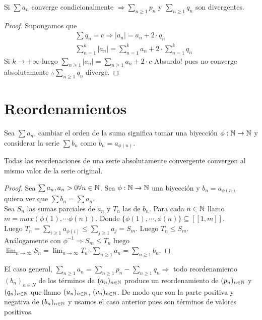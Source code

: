\begin{theorem}
  Si \(\sum a_n\) converge condicionalmente \(\Rightarrow \sum_{n \geq 1} p_n\) y \(\sum_{n \geq 1} q_n\) son divergentes.

  \begin{proof}
    Supongamos que \begin{align*}
      & \sum q_n = c \Rightarrow |a_n| = a_n + 2 \cdot q_n \\
      & \sum_{n = 1}^k |a_n| = \sum_{n = 1}^k a_n + 2 \cdot \sum_{n = 1}^k q_n
    \end{align*}
    Si \(k \to +\infty\) luego \(\sum_{n \geq 1} |a_n| = \sum_{n \geq 1} a_n + 2 \cdot c\) Absurdo! pues no converge absolutamente \(\therefore \sum_{n \geq 1} q_n\) diverge.
  \end{proof}
\end{theorem}

\section{Reordenamientos}

\begin{definition}
  Sea \(\sum a_n\), cambiar el orden de la suma significa tomar una biyección \(\phi: \mathbb{N} \to \mathbb{N}\) y considerar la serie \(\sum b_n\) como \(b_n = a_{\phi(n)}\).
\end{definition}

\begin{theorem}
  Todas las reordenaciones de una serie absolutamente convergente convergen al mismo valor de la serie original.
  \begin{proof}
    Sea \(\sum a_n, a_n > 0 \forall n \in \mathbb{N}\). Sea \(\phi: \mathbb{N} \to \mathbb{N}\) una biyección y \(b_n = a_{\phi(n)}\) quiero ver que \(\sum b_n = \sum a_n\). \\
    Sea \(S_n\) las sumas parciales de \(a_n\) y \(T_n\) las de \(b_n\). Para cada \(n \in \mathbb{N}\) llamo \(m = max(\phi(1), \cdots \phi(n))\). Donde \(\{ \phi(1), \cdots, \phi(n) \} \subseteq [[1, m]]\). \\
    Luego \(T_n = \sum_{i \geq 1} a_{\phi(i)} \leq \sum_{j \geq 1} a_j = S_m\). Luego \(T_n \leq S_m\). \\
    Análogamente con \(\phi^{-1} \Rightarrow S_m \leq T_n\) luego \(\lim_{n \to \infty} S_n = \lim_{n \to \infty} T_n \therefore \sum_{n \geq 1} a_n = \sum_{n \geq 1} b_n\).
  \end{proof}
\end{theorem}

El caso general, \(\sum_{n \geq 1} a_n = \sum_{n \geq 1} p_n - \sum_{n \geq 1} q_n \Rightarrow\) todo reordenamiento \((b_n)_{n \in N}\) de los términos de \((a_n)_{n \in \mathbb{N}}\) produce un reordenamiento de \((p_n)_{n \in \mathbb{N}}\) y \((q_n)_{n \in \mathbb{N}}\) que llamo \((u_n)_{n \in \mathbb{N}}\), \((v_n)_{n \in \mathbb{N}}\). De modo que son la parte positiva y negativa de \((b_n)_{n \in \mathbb{N}}\) y usamos el caso anterior pues son términos de valores positivos.

